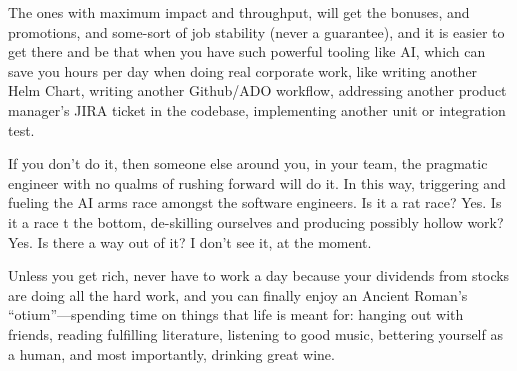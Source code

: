 \documentclass[12pt]{article}
\begin{document}
The ones with maximum impact and throughput, will get the bonuses, and
promotions, and some-sort of job stability (never a guarantee), and it is easier
to get there and be that when you have such powerful tooling like AI, which can
save you hours per day when doing real corporate work, like writing another Helm
Chart, writing another Github/ADO workflow, addressing another product manager's
JIRA ticket in the codebase, implementing another unit or integration test.

If you don't do it, then someone else around you, in your team, the pragmatic
engineer with no qualms of rushing forward will do it. In this way, triggering
and fueling the AI arms race amongst the software engineers. Is it a rat race?
Yes. Is it a race t the bottom, de-skilling ourselves and producing possibly
hollow work? Yes. Is there a way out of it? I don't see it, at the moment.

Unless you get rich, never have to work a day because your dividends from stocks
are doing all the hard work, and you can finally enjoy an Ancient Roman's
``otium''---spending time on things that life is meant for: hanging out with
friends, reading fulfilling literature, listening to good music, bettering
yourself as a human, and most importantly, drinking great wine.
\end{document}

